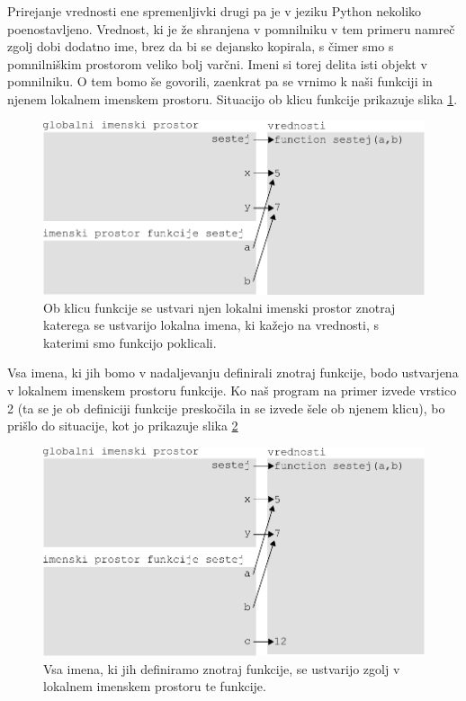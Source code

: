 Prirejanje vrednosti ene spremenljivki drugi pa je v jeziku Python nekoliko poenostavljeno. Vrednost, ki je že shranjena v pomnilniku v tem primeru namreč zgolj dobi dodatno ime, brez da bi se dejansko kopirala, s čimer smo s pomnilniškim prostorom veliko bolj varčni. Imeni si torej delita isti objekt v pomnilniku. O tem bomo še govorili, zaenkrat pa se vrnimo k naši funkciji in njenem lokalnem imenskem prostoru. Situacijo ob klicu funkcije prikazuje slika \ref{img:imenski_prostor_3}.
\begin{figure}
    \centering
    \includegraphics[width=\linewidth]{img/imenski_prostor_3.pdf}
    \caption{Ob klicu funkcije se ustvari njen lokalni imenski prostor znotraj katerega se ustvarijo lokalna imena, ki kažejo na vrednosti, s katerimi smo funkcijo poklicali.}
    \label{img:imenski_prostor_3}
\end{figure}

Vsa imena, ki jih bomo v nadaljevanju definirali znotraj funkcije, bodo ustvarjena v lokalnem imenskem prostoru funkcije. Ko naš program na primer izvede vrstico 2 (ta se je ob definiciji funkcije preskočila in se izvede šele ob njenem klicu), bo prišlo do situacije, kot jo prikazuje slika \ref{img:imenski_prostor_4}
\begin{figure}
    \centering
    \includegraphics[width=\linewidth]{img/imenski_prostor_4.pdf}
    \caption{Vsa imena, ki jih definiramo znotraj funkcije, se ustvarijo zgolj v lokalnem imenskem prostoru te funkcije.}
    \label{img:imenski_prostor_4}
\end{figure}

